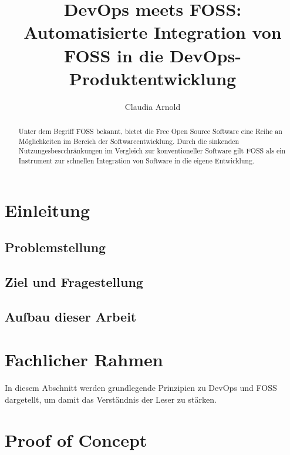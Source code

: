 \documentclass[12pt,titlepage]{article}
\begin{document}
\title{DevOps meets FOSS: Automatisierte Integration von FOSS in die DevOps-Produktentwicklung\\}

\author{Claudia Arnold}

\maketitle

\begin{abstract}
   Unter dem Begriff FOSS bekannt, bietet die Free Open Source Software eine Reihe an Möglichkeiten im Bereich der Softwareentwicklung. Durch die sinkenden Nutzungesbescchränkungen im Vergleich zur konventioneller Software gilt FOSS als ein Instrument zur schnellen Integration von Software in die eigene Entwicklung.  
    \end{abstract}

\section{Einleitung}



\subsection{Problemstellung}



\subsection{Ziel und Fragestellung}



\subsection{Aufbau dieser Arbeit}



\section{Fachlicher Rahmen}

In diesem Abschnitt werden grundlegende Prinzipien zu DevOps und FOSS dargetellt, um damit das Verständnis der Leser zu stärken.\\






\section{Proof of Concept}


\end{document}
